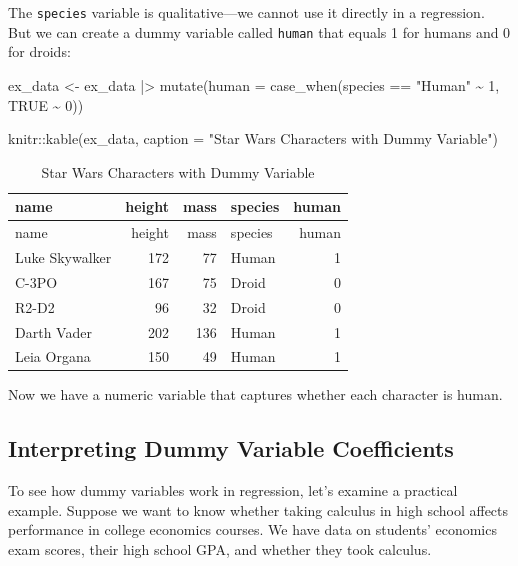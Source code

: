 \documentclass[
  letterpaper,
  DIV=11,
  numbers=noendperiod]{scrreprt}
\newenvironment{Shaded}{\begin{snugshade}}{\end{snugshade}}
\newcommand{\AttributeTok}[1]{\textcolor[rgb]{0.40,0.45,0.13}{#1}}
\newcommand{\ConstantTok}[1]{\textcolor[rgb]{0.56,0.35,0.01}{#1}}
\newcommand{\DecValTok}[1]{\textcolor[rgb]{0.68,0.00,0.00}{#1}}
\newcommand{\FunctionTok}[1]{\textcolor[rgb]{0.28,0.35,0.67}{#1}}
\newcommand{\NormalTok}[1]{\textcolor[rgb]{0.00,0.23,0.31}{#1}}
\newcommand{\OtherTok}[1]{\textcolor[rgb]{0.00,0.23,0.31}{#1}}
\newcommand{\SpecialCharTok}[1]{\textcolor[rgb]{0.37,0.37,0.37}{#1}}
\newcommand{\StringTok}[1]{\textcolor[rgb]{0.13,0.47,0.30}{#1}}
\begin{document}
The \texttt{species} variable is qualitative---we cannot use it directly
in a regression. But we can create a dummy variable called
\texttt{human} that equals 1 for humans and 0 for droids:

\begin{Shaded}
\begin{Highlighting}[]
\NormalTok{ex\_data }\OtherTok{\textless{}{-}}\NormalTok{ ex\_data }\SpecialCharTok{|\textgreater{}} 
    \FunctionTok{mutate}\NormalTok{(}\AttributeTok{human =} \FunctionTok{case\_when}\NormalTok{(species }\SpecialCharTok{==} \StringTok{"Human"} \SpecialCharTok{\textasciitilde{}} \DecValTok{1}\NormalTok{,}
                             \ConstantTok{TRUE} \SpecialCharTok{\textasciitilde{}} \DecValTok{0}\NormalTok{))}

\NormalTok{knitr}\SpecialCharTok{::}\FunctionTok{kable}\NormalTok{(ex\_data, }\AttributeTok{caption =} \StringTok{"Star Wars Characters with Dummy Variable"}\NormalTok{)}
\end{Highlighting}
\end{Shaded}

\begin{longtable}[]{@{}lrrlr@{}}
\caption{Star Wars Characters with Dummy Variable}\tabularnewline
\toprule\noalign{}
name & height & mass & species & human \\
\midrule\noalign{}
\endfirsthead
\toprule\noalign{}
name & height & mass & species & human \\
\midrule\noalign{}
\endhead
\bottomrule\noalign{}
\endlastfoot
Luke Skywalker & 172 & 77 & Human & 1 \\
C-3PO & 167 & 75 & Droid & 0 \\
R2-D2 & 96 & 32 & Droid & 0 \\
Darth Vader & 202 & 136 & Human & 1 \\
Leia Organa & 150 & 49 & Human & 1 \\
\end{longtable}

Now we have a numeric variable that captures whether each character is
human.

\subsection{Interpreting Dummy Variable
Coefficients}\label{interpreting-dummy-variable-coefficients}

To see how dummy variables work in regression, let's examine a practical
example. Suppose we want to know whether taking calculus in high school
affects performance in college economics courses. We have data on
students' economics exam scores, their high school GPA, and whether they
took calculus.
\end{document}
